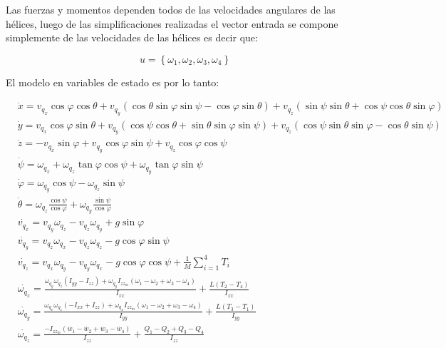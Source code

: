 \documentclass[main]{subfiles}
\begin{document}
Las fuerzas y momentos dependen todos de las velocidades angulares de las h\'elices, luego de las simplificaciones realizadas el vector entrada se compone simplemente de las velocidades de las h\'elices es decir que:

$$u=\left\lbrace\omega_1, \omega_2, \omega_3, \omega_4\right\rbrace$$

El modelo en variables de estado es por lo tanto:

\begin{equation}
\boxed{\begin{aligned}&\dot{x}=v_{q_x} \cos \varphi \cos \theta + v_{q_y} ( \cos \theta \sin \varphi \sin \psi-\cos \varphi \sin \theta ) + v_{q_z}(\sin \psi \sin \theta + \cos \psi \cos \theta \sin \varphi)\\
&\dot{y}=v_{q_x} \cos \varphi \sin \theta + v_{q_y} (\cos \psi \cos \theta + \sin \theta \sin \varphi \sin \psi) + v_{q_z}( \cos \psi \sin \theta \sin \varphi-\cos \theta \sin \psi )\\
&\dot{z}= -v_{q_x} \sin \varphi  + v_{q_y} \cos \varphi \sin \psi  + v_{q_z}\cos \varphi \cos \psi\\
&\dot{\psi}=\omega_{q_x} + \omega_{q_z}\tan\varphi \cos\psi + \omega_{q_y}\tan\varphi \sin\psi\\
&\dot{\varphi}=\omega_{q_y}\cos \psi - \omega_{q_z}\sin\psi\\
&\dot{\theta}=\omega_{q_z} \frac{\cos\psi}{\cos\varphi}  + \omega_{q_y}\frac{\sin\psi}{\cos\varphi}\\
&\dot{v_{q_x}}=v_{q_y} \omega_{q_z} - v_{q_z} \omega_{q_y}+g\sin\varphi\\
&\dot{v_{q_y}}=v_{q_z} \omega_{q_x} - v_{q_z} \omega_{q_z}-g\cos\varphi\sin\psi\\
&\dot{v_{q_z}}=v_{q_x} \omega_{q_y} - v_{q_y} \omega_{q_x}-g\cos\varphi\cos\psi+\frac{1}{M}\sum_{i=1}^4T_i\\
&\dot{\omega_{q_x}}=\frac{\omega_{q_y}\omega_{q_z}(I_{yy}-I_{zz})+\omega_{q_y}I_{zz_m}(\omega_1-\omega_2+\omega_3-\omega_4)}{I_{xx}}+\frac{L(T_2-T_4)}{I_{xx}}\\
&\dot{\omega_{q_y}}=\frac{\omega_{q_x}\omega_{q_z}(-I_{xx}+I_{zz})+\omega_{q_x}I_{zz_m}(\omega_1-\omega_2+\omega_3-\omega_4)}{{I_{yy}}}+\frac{L(T_3-T_1)}{I_{yy}}\\
&\dot{\omega_{q_z}}=\frac{-I_{zz_m}(\dot{w_1}-\dot{w_2}+\dot{w_3}-\dot{w_4})}{I_{zz}}+\frac{Q_1-Q_2+Q_3-Q_4}{I_{zz}}\\
\end{aligned}}
\end{equation}
\end{document}
